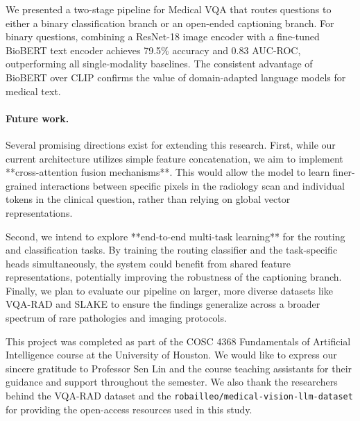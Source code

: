 \documentclass{article}
\begin{document}
We presented a two-stage pipeline for Medical VQA that routes questions to
either a binary classification branch or an open-ended captioning branch. For
binary questions, combining a ResNet-18 image encoder with a fine-tuned BioBERT
text encoder achieves 79.5\% accuracy and 0.83 AUC-ROC, outperforming all
single-modality baselines. The consistent advantage of BioBERT over CLIP
confirms the value of domain-adapted language models for medical text.

\paragraph{Future work.}
Several promising directions exist for extending this research. First, while our current architecture utilizes simple feature concatenation, we aim to implement **cross-attention fusion mechanisms**. This would allow the model to learn finer-grained interactions between specific pixels in the radiology scan and individual tokens in the clinical question, rather than relying on global vector representations. 

Second, we intend to explore **end-to-end multi-task learning** for the routing and classification tasks. By training the routing classifier and the task-specific heads simultaneously, the system could benefit from shared feature representations, potentially improving the robustness of the captioning branch. Finally, we plan to evaluate our pipeline on larger, more diverse datasets like VQA-RAD and SLAKE to ensure the findings generalize across a broader spectrum of rare pathologies and imaging protocols.
\begin{ack}

\end{ack}


\begin{ack}
This project was completed as part of the COSC 4368 Fundamentals of Artificial Intelligence course at the University of Houston. We would like to express our sincere gratitude to Professor Sen Lin and the course teaching assistants for their guidance and support throughout the semester. We also thank the researchers behind the VQA-RAD dataset and the \texttt{robailleo/medical-vision-llm-dataset} for providing the open-access resources used in this study.
\end{ack}

\end{document}
